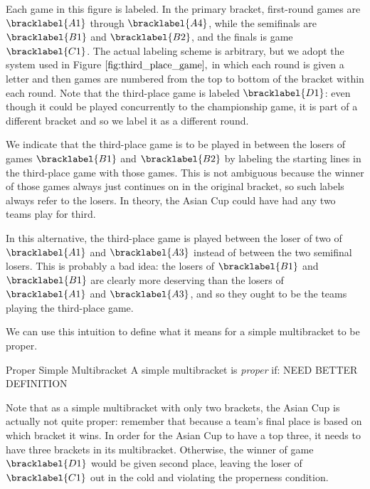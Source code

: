 {    

    Each game in this figure is labeled. In the primary bracket, first-round games are $\bracklabel{A1}$ through $\bracklabel{A4}$, while the semifinals are $\bracklabel{B1}$ and $\bracklabel{B2}$, and the finals is game $\bracklabel{C1}$. The actual labeling scheme is arbitrary, but we adopt the system used in Figure $\ref{fig:third_place_game},$ in which each round is given a letter and then games are numbered from the top to bottom of the bracket within each round. Note that the third-place game is labeled $\bracklabel{D1}$: even though it could be played concurrently to the championship game, it is part of a different bracket and so we label it as a different round.

    We indicate that the third-place game is to be played in between the losers of games $\bracklabel{B1}$ and $\bracklabel{B2}$ by labeling the starting lines in the third-place game with those games. This is not ambiguous because the winner of those games always just continues on in the original bracket, so such labels always refer to the losers. In theory, the Asian Cup could have had any two teams play for third.


    In this alternative, the third-place game is played between the loser of two of $\bracklabel{A1}$ and $\bracklabel{A3}$ instead of between the two semifinal losers. This is probably a bad idea: the losers of $\bracklabel{B1}$ and $\bracklabel{B1}$ are clearly more deserving than the losers of $\bracklabel{A1}$ and $\bracklabel{A3}$, and so they ought to be the teams playing the third-place game.

    We can use this intuition to define what it means for a simple multibracket to be proper.

    \begin{definition}{Proper Simple Multibracket}{}
        A simple multibracket is \textit{proper} if: 
        NEED BETTER DEFINITION
    \end{definition}

    Note that as a simple multibracket with only two brackets, the Asian Cup is actually not quite proper: remember that because a team's final place is based on which bracket it wins. In order for the Asian Cup to have a top three, it needs to have three brackets in its multibracket. Otherwise, the winner of game $\bracklabel{D1}$ would be given second place, leaving the loser of $\bracklabel{C1}$ out in the cold and violating the properness condition.

}
